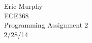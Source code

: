 \documentclass[12pt]{article}
\begin{document}
\begin{flushright}
  Eric Murphy \\
  ECE368 \\
  Programming Assignment 2 \\
  2/28/14
\end{flushright}
\end{document}
